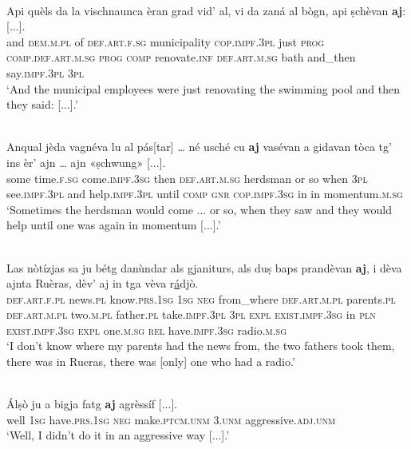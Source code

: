 \ea
\label{ex:aj:5}
\\
\gll  Api quèls da la vischnaunca èran grad vid' al, vi da zaná al bògn, api ṣchèvan \textbf{aj}: [...]. \\
and \textsc{dem.m.pl} of \textsc{def.art.f.sg} municipality \textsc{cop.impf.3pl} just \textsc{prog} \textsc{comp.def.art.m.sg} \textsc{prog} \textsc{comp} renovate.\textsc{inf} \textsc{def.art.m.sg} bath and\_then say.\textsc{impf.3pl} \textsc{3pl} \\
\glt `And the municipal employees were just renovating the swimming pool and then they said: [...].'
\z

\ea
\label{ex:aj:7}
\\
\gll  Anqual jèda vagnéva lu al pás[tar] … né usché cu \textbf{aj} vasévan a gidavan tòca tg’ ins èr’ ajn … ajn «ṣchwung»\footnotemark{} [...].\\
some time.\textsc{f.sg} come.\textsc{impf.3sg} then \textsc{def.art.m.sg} herdsman {} or so when \textsc{3pl} see.\textsc{impf.3pl} and help.\textsc{impf.3pl} until \textsc{comp} \textsc{gnr} \textsc{cop.impf.3sg} in {} in momentum.\textsc{m.sg}\\
\glt `Sometimes the herdsman would come ... or so, when they saw and they would help until one was again in momentum [...].'
\z

\ea
\label{ex:aj:6}
\\
\gll    Las nòtízjas sa ju bétg danùndar als gjaniturs, als duṣ baps prandèvan \textbf{aj}, i dèva ajnta Ruèras, dèv’ aj in tga vèva r\underline{á}djò.\\
\textsc{def.art.f.pl} news.\textsc{pl} know.\textsc{prs.1sg} \textsc{1sg} \textsc{neg} from\_where \textsc{def.art.m.pl} parents.\textsc{pl} \textsc{def.art.m.pl} two.\textsc{m.pl} father.\textsc{pl} take.\textsc{impf.3pl} \textsc{3pl} \textsc{expl} \textsc{exist.impf.3sg} in \textsc{pln} \textsc{exist.impf.3sg} \textsc{expl}  one.\textsc{m.sg} \textsc{rel} have.\textsc{impf.3sg} radio.\textsc{m.sg} \ \\
\glt `I don’t know where my parents had the news from, the two fathers took them, there was in Rueras, there was [only] one who had a radio.'
\z

\ea
\label{ex:aj:8}
\\
\gll  Álṣò ju a bigja fatg \textbf{aj} agrèssíf [...].\\
well \textsc{1sg} have.\textsc{prs.1sg} \textsc{neg} make.\textsc{ptcm.unm} \textsc{3.unm} aggressive.\textsc{adj.unm}\\
\glt `Well, I didn’t do it in an aggressive way [...].'
\z

